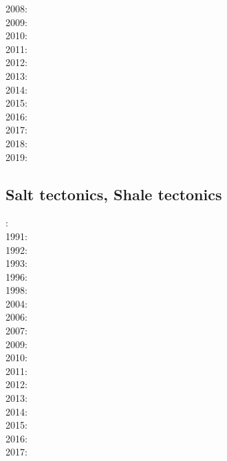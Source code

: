 {2008: \cite{cort08}\cite{gumb08}\cite{buhb08}\cite{hube08}\cite{peso08}\\
2009: \cite{agcz09}\cite{kekj09}\cite{sihb09}\\
2010: \cite{aubh10}\cite{gery10}\cite{fosr10}\cite{gerya2010}\\
2011: \cite{alht11}\cite{ellw11}\cite{hube11}\\
2012: \cite{alht12}\cite{brps12}\cite{bein12}\\
2013: \cite{alhf13}\cite{brau13}\cite{chbe13}\cite{knak13}\cite{kern13}\cite{mipf13}\cite{wabd13}
      \cite{gery13}\cite{ligw13}\cite{gery13c}\\
2014: \cite{hebr14}\cite{lige14}\cite{brun14}\cite{kobf14}\cite{ebva14}\cite{puge14}\cite{lige14b}
      \cite{hube14}\\
2015: \cite{nabu15}\cite{clbq15}\cite{huyb15}\cite{shmj15}\\
2016: \cite{olbm16}\cite{jekm16}\cite{zwsn16}\\
2017: \cite{lemh17}\cite{brcr17}\cite{bekb17}\cite{nabp17}\\
2018: \cite{chsm18}\cite{brwm18}\cite{brun18}\cite{tebu18}\cite{jebu18}\cite{sahf18}\cite{pesn18}
      \cite{mord18}\cite{webe18}\cite{webe18b}\\
2019: \cite{lisp19}\cite{zwsb19}\cite{anpa19}\cite{dual19}\cite{mocb19}\cite{chmd19}\cite{thhu19}
}

\subsection{Salt tectonics, Shale tectonics}

{\scriptsize
{}: \cite{woid78}\\
1991: \cite{tars91}\\
1992: \cite{zaju92}\\
1993: \cite{nabr93}\cite{vasv93}\cite{wejv93}\\
1996: \cite{maar96}\\
1998: \cite{giju98}\\
2004: \cite{istt04}\cite{geim04}\\
2006: \cite{maqs07}\\
2007: \cite{huja07}\cite{maqs07}\\
2009: \cite{grba09}\\
2010: \cite{albe10}\cite{albi10}\cite{inbe10}\cite{inbe10b}\\
2011: \cite{brfo11}\\
2012: \cite{fejr12}\cite{liqi12}\cite{grbe12}\cite{albe12}\cite{grbi12}\cite{goib12}\\
2013: \cite{gobi13}\\
2014: \cite{bakp14}\cite{feka14a}\cite{feka14b}\cite{ghbu14}\cite{nifh14}\\
2015: \cite{feka15}\\
2016: \cite{masg16}\cite{albe16}\\
2017: \cite{grbe17}
}

